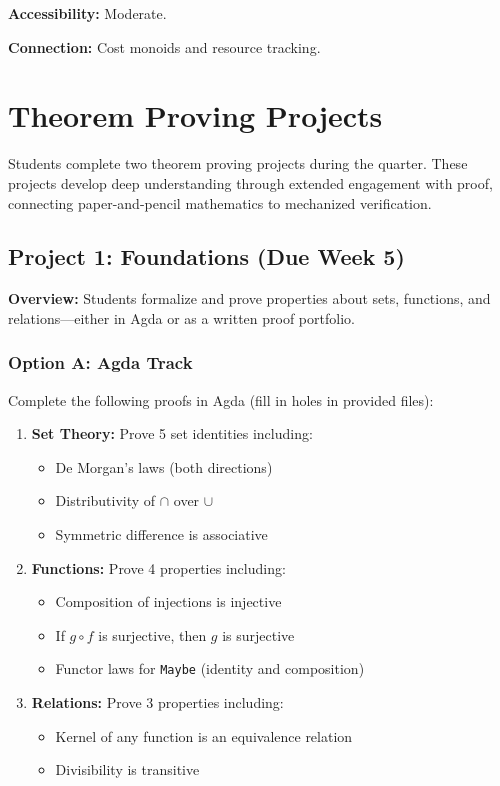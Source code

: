 \documentclass[11pt]{article}
\begin{document}
\textbf{Accessibility:} Moderate.

\textbf{Connection:} Cost monoids and resource tracking.

\newpage
\section{Theorem Proving Projects}
\label{sec:projects}

Students complete two theorem proving projects during the quarter. These projects develop deep understanding through extended engagement with proof, connecting paper-and-pencil mathematics to mechanized verification.

\subsection{Project 1: Foundations (Due Week 5)}

\textbf{Overview:} Students formalize and prove properties about sets, functions, and relations---either in Agda or as a written proof portfolio.

\subsubsection{Option A: Agda Track}
Complete the following proofs in Agda (fill in holes in provided files):
\begin{enumerate}
    \item \textbf{Set Theory:} Prove 5 set identities including:
    \begin{itemize}
        \item De Morgan's laws (both directions)
        \item Distributivity of $\cap$ over $\cup$
        \item Symmetric difference is associative
    \end{itemize}
    \item \textbf{Functions:} Prove 4 properties including:
    \begin{itemize}
        \item Composition of injections is injective
        \item If $g \circ f$ is surjective, then $g$ is surjective
        \item Functor laws for \texttt{Maybe} (identity and composition)
    \end{itemize}
    \item \textbf{Relations:} Prove 3 properties including:
    \begin{itemize}
        \item Kernel of any function is an equivalence relation
        \item Divisibility is transitive
    \end{itemize}
\end{enumerate}
\end{document}
